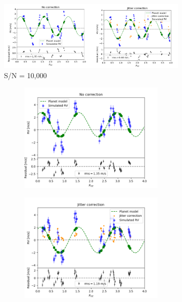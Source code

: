 \begin{figure}[tbp]	
\centering
    \begin{subfigure}[b]{1.0\textwidth}
		\includegraphics[width = 0.99 \linewidth]{./Figures/Methods/Fitting_p2j2sn10000.png}
        \caption{S/N = 10,000}
    \end{subfigure}
    \begin{subfigure}[b]{1.0\textwidth}
    		\begin{subfigure}[b]{0.49\textwidth}
        		\includegraphics[width=\textwidth]{./Figures/Methods/Fitting_5-Fit2.png}
		\end{subfigure}
		\begin{subfigure}[b]{0.49\textwidth}        		
        		\includegraphics[width=\textwidth]{./Figures/Methods/Fitting_5-Fit1_XY.png}

\end{subfigure}
\end{subfigure}
\end{figure}
